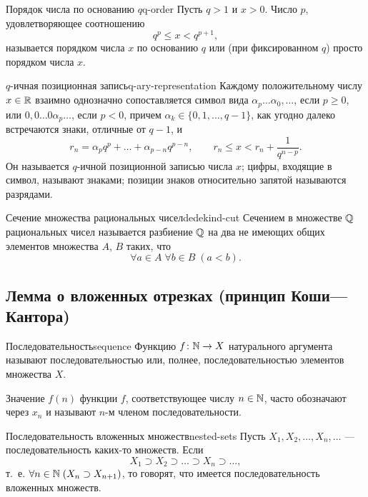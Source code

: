 \begin{definition}{Порядок числа по основанию $q$}{q-order}
  Пусть $q>1$ и $x>0$. Число $p$, удовлетворяющее соотношению
  \[
    q^p\le x<q^{p+1},
  \]
  называется порядком числа $x$ по основанию $q$ или (при фиксированном
  $q$) просто порядком числа $x$.
\end{definition}

\begin{definition}{$q$-ичная позиционная запись}{q-ary-representation}
  Каждому положительному числу $x\in\mathbb{R}$ взаимно однозначно сопоставляется
  символ вида $\alpha_p\ldots\alpha_0,\ldots$, если $p\ge0$, или
  $0,0\ldots0\alpha_p\ldots$, если $p<0$, причем
  $\alpha_k\in\{0,1,\ldots,q-1\}$, как угодно далеко встречаются знаки,
  отличные от $q-1$, и
  \[
    r_n=\alpha_pq^p+\ldots+\alpha_{p-n}q^{p-n},
    \qquad
    r_n\le x<r_n+\frac{1}{q^{n-p}}.
  \]
  Он называется $q$-ичной позиционной записью числа $x$; цифры, входящие в
  символ, называют знаками; позиции знаков относительно запятой называются
  разрядами.
\end{definition}

\begin{definition}{Сечение множества рациональных чисел}{dedekind-cut}
  Сечением в множестве $\mathbb{Q}$ рациональных чисел называется разбиение $\mathbb{Q}$
  на два не имеющих общих элементов множества $A$, $B$ таких, что
  \[
    \forall a\in A\;\forall b\in B\;(a<b).
  \]
\end{definition}

\clearpage
{}

\subsection{Лемма о вложенных отрезках (принцип Коши—Кантора)}

\begin{definition}{Последовательность}{sequence}
  Функцию $f\colon\mathbb{N}\to X$ натурального аргумента называют
  последовательностью или, полнее, последовательностью элементов множества
  $X$.

  Значение $f(n)$ функции $f$, соответствующее числу $n\in\mathbb{N}$, часто
  обозначают через $x_n$ и называют $n$-м членом последовательности.
\end{definition}

\begin{definition}{Последовательность вложенных множеств}{nested-sets}
  Пусть $X_1,X_2,\ldots,X_n,\ldots$ — последовательность каких-то множеств.
  Если
  \[
    X_1\supset X_2\supset\ldots\supset X_n\supset\ldots,
  \]
  т.~е. $\forall n\in\mathbb{N}\;(X_n\supset X_{n+1})$, то говорят, что имеется
  последовательность вложенных множеств.
\end{definition}

